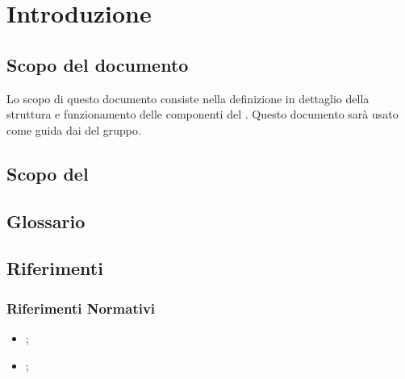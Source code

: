 \section{Introduzione}
	\subsection{Scopo del documento}
	Lo scopo di questo documento consiste nella definizione in dettaglio della struttura e funzionamento delle componenti del  \PROGETTO.
	Questo documento sarà usato come guida dai \PRP{} del gruppo.
	\subsection{Scopo del }
		\SCOPO
	\subsection{Glossario}
		\GLOSSARIO
	\subsection{Riferimenti}
	  \subsubsection{Riferimenti Normativi}
	    \begin{itemize}
		  \item \NPdocRP{};
		  \item \ARdocRP{};
	    \end{itemize}

